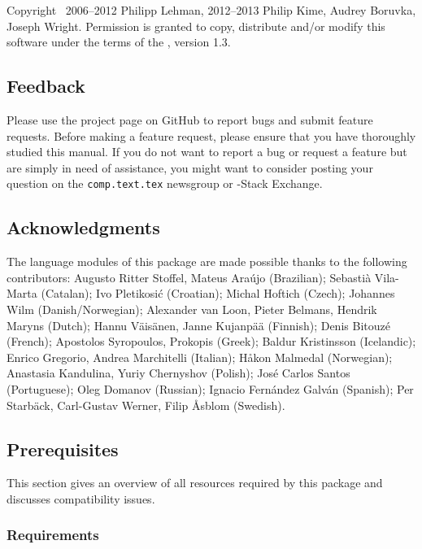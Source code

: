 \documentclass{ltxdockit}[2011/03/25]
\begin{document}
Copyright \textcopyright\ 2006--2012 Philipp Lehman, 2012--2013 Philip Kime, Audrey Boruvka, Joseph Wright. Permission is granted to copy, distribute and\slash or modify this software under  the terms of the \lppl, version 1.3.

\subsection{Feedback}
\label{int:feb}

Please use the  project page on GitHub to report bugs and submit feature requests. Before making a feature request, please ensure that you have thoroughly studied this manual. If you do not want to report a bug or request a feature but are simply in need of assistance, you might want to consider posting your question on the \texttt{comp.text.tex} newsgroup or \tex-\latex Stack Exchange.

\subsection{Acknowledgments}

The language modules of this package are made possible thanks to the following contributors:
Augusto Ritter Stoffel, Mateus Araújo (Brazilian);
Sebastià Vila-Marta (Catalan);
Ivo Pletikosić (Croatian);
Michal Hoftich (Czech);
Johannes Wilm (Danish\slash Norwegian);
Alexander van Loon, Pieter Belmans, Hendrik Maryns (Dutch);
Hannu Väisänen, Janne Kujanpää (Finnish);
Denis Bitouzé (French);
Apostolos Syropoulos, Prokopis (Greek);
Baldur Kristinsson (Icelandic);
Enrico Gregorio, Andrea Marchitelli (Italian);
Håkon Malmedal (Norwegian);
Anastasia Kandulina, Yuriy Chernyshov (Polish);
José Carlos Santos (Portuguese);
Oleg Domanov (Russian);
Ignacio Fernández Galván (Spanish);
Per Starbäck, Carl-Gustav Werner, Filip Åsblom (Swedish).
 
\subsection{Prerequisites}
\label{int:pre}

This section gives an overview of all resources required by this package and discusses compatibility issues.

\subsubsection{Requirements}
\label{int:pre:req}
\end{document}
